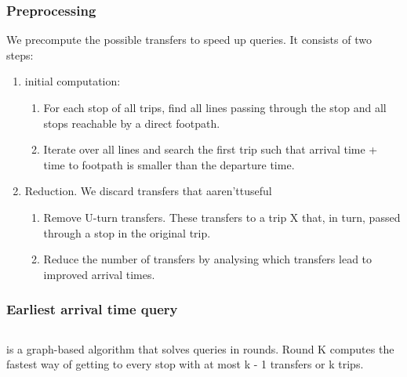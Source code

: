 \subsubsection{Preprocessing}
We precompute the possible transfers to speed up queries. It consists of two steps:
\begin{enumerate}
    \item initial computation: \begin{enumerate}
        \item For each stop of all trips, find all lines passing through the stop and all stops reachable by a direct footpath.
        \item Iterate over all lines and search the first trip such that arrival time + time to footpath is smaller than the departure time.
    \end{enumerate}
    \item Reduction. We discard transfers that aaren'ttuseful \begin{enumerate}
        \item Remove U-turn transfers. These transfers to a trip X that, in turn, passed through a stop in the original trip.
        \item Reduce the number of transfers by analysing which transfers lead to improved arrival times.
    \end{enumerate}
    
\end{enumerate}
\subsubsection{Earliest arrival time query}

\subsection{}
 is a graph-based algorithm that solves queries in rounds. Round K computes the fastest way of getting to every stop with at most k - 1 transfers or k trips.

